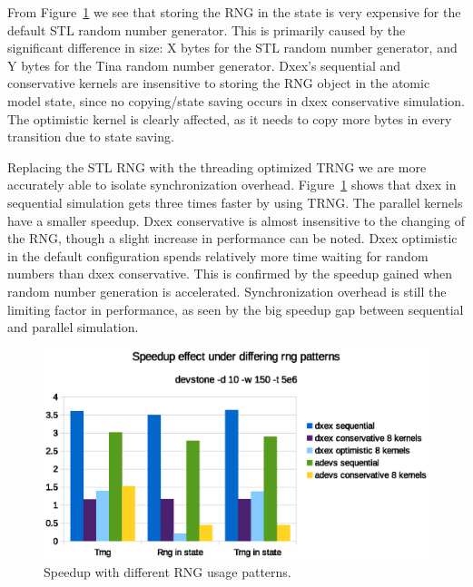 From Figure~\ref{fig:Queuerngspeedup} we see that storing the RNG in the state is very expensive for the default STL random number generator.
This is primarily caused by the significant difference in size: X bytes for the STL random number generator, and Y bytes for the Tina random number generator.
Dxex's sequential and conservative kernels are insensitive to storing the RNG object in the atomic model state, since no copying/state saving occurs in dxex conservative simulation.
The optimistic kernel is clearly affected, as it needs to copy more bytes in every transition due to state saving.

Replacing the STL RNG with the threading optimized TRNG we are more accurately able to isolate synchronization overhead.
Figure~\ref{fig:Queuerngspeedup} shows that dxex in sequential simulation gets three times faster by using TRNG.
The parallel kernels have a smaller speedup.
Dxex conservative is almost insensitive to the changing of the RNG, though a slight increase in performance can be noted.
Dxex optimistic in the default configuration spends relatively more time waiting for random numbers than dxex conservative.
This is confirmed by the speedup gained when random number generation is accelerated.
Synchronization overhead is still the limiting factor in performance, as seen by the big speedup gap between sequential and parallel simulation.

\begin{figure}
    \center

    \includegraphics[width=\modelfraction\columnwidth]{fig/rngspeedupeffectdevstone.eps}
    \caption{Speedup with different RNG usage patterns.}
    \label{fig:Queuerngspeedup}
\end{figure}
